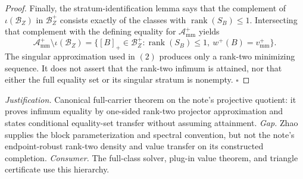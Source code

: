 \documentclass{article}
\begin{document}
\begin{proof}
Finally, the stratum-identification lemma says that the complement of \(\iota(\mathcal B_Z)\) in \(\mathcal B_Z^+\) consists exactly of the classes with \(\operatorname{rank}(S_B)\le1\).  Intersecting that complement with the defining equality for \(\mathcal A_{\mathrm{mm}}^+\) yields
\[
 \mathcal A_{\mathrm{mm}}^+\setminus\iota(\mathcal B_Z)
 =\{[B]_+\in\mathcal B_Z^+:\operatorname{rank}(S_B)\le1,\ w^+(B)=v_{\mathrm{mm}}^+\}.
\]
The singular approximation used in \((2)\) produces only a rank-two minimizing sequence.  It does not assert that the rank-two infimum is attained, nor that either the full equality set or its singular stratum is nonempty. \(\square\)
\end{proof}
\par\smallskip\noindent \textit{Justification.} Canonical full-carrier theorem on the note's projective quotient: it proves infimum equality by one-sided rank-two projector approximation and states conditional equality-set transfer without assuming attainment. \textit{Gap.} Zhao supplies the block parameterization and spectral convention, but not the note's endpoint-robust rank-two density and value transfer on its constructed completion. \textit{Consumer.} The full-class solver, plug-in value theorem, and triangle certificate use this hierarchy.
\end{document}
